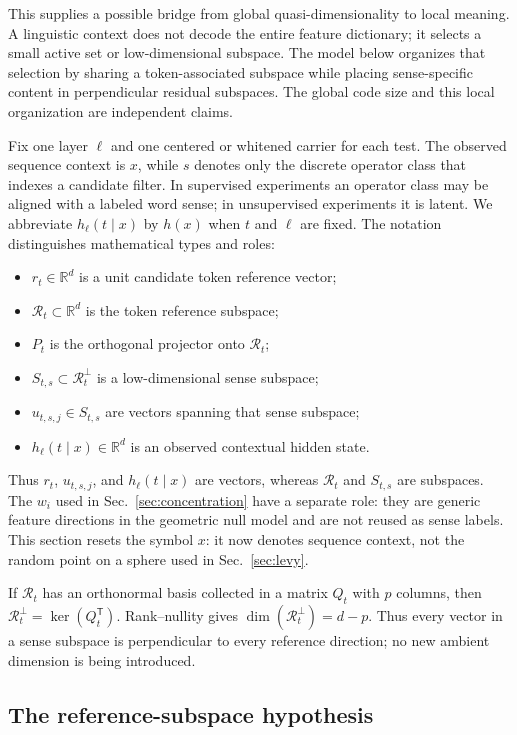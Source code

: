 \documentclass[
  aps,
  reprint,
  superscriptaddress,
  floatfix,
  nofootinbib,
  longbibliography
]{revtex4-2}
\newcommand{\R}{\mathbb{R}}
\newcommand{\T}{^{\mathsf{T}}}
\begin{document}
This supplies a possible bridge from global quasi-dimensionality to local
meaning.  A linguistic context does not decode the entire feature dictionary;
it selects a small active set or low-dimensional subspace.  The model below
organizes that selection by sharing a token-associated subspace while placing
sense-specific content in perpendicular residual subspaces.  The global code
size and this local organization are independent claims.

Fix one layer $\ell$ and one centered or whitened carrier for each test.  The
observed sequence context is $x$, while $s$ denotes only the discrete operator
class that indexes a candidate filter.  In supervised experiments an operator
class may be aligned with a labeled word sense; in unsupervised experiments it
is latent.  We abbreviate $h_\ell(t\mid x)$ by $h(x)$ when $t$ and $\ell$ are
fixed.  The notation distinguishes mathematical types and roles:
%
\begin{itemize}
\item $r_t\in\R^d$ is a unit candidate token reference vector;
\item $\mathcal R_t\subset\R^d$ is the token reference subspace;
\item $P_t$ is the orthogonal projector onto $\mathcal R_t$;
\item $S_{t,s}\subset\mathcal R_t^\perp$ is a low-dimensional sense
subspace;
\item $u_{t,s,j}\in S_{t,s}$ are vectors spanning that sense subspace;
\item $h_\ell(t\mid x)\in\R^d$ is an observed contextual hidden state.
\end{itemize}
%
Thus $r_t$, $u_{t,s,j}$, and $h_\ell(t\mid x)$ are vectors, whereas
$\mathcal R_t$ and $S_{t,s}$ are subspaces. The $w_i$ used in
Sec.~\ref{sec:concentration} have a separate role: they are generic feature
directions in the geometric null model and are not reused as sense labels.
This section resets the symbol $x$: it now denotes sequence context, not the
random point on a sphere used in Sec.~\ref{sec:levy}.

If $\mathcal R_t$ has an orthonormal basis collected in a matrix $Q_t$ with
$p$ columns, then $\mathcal R_t^\perp=\ker(Q_t\T)$.  Rank--nullity gives
$\dim(\mathcal R_t^\perp)=d-p$.  Thus every vector in a sense subspace is
perpendicular to every reference direction; no new ambient dimension is being
introduced.

\subsection{The reference-subspace hypothesis}
\label{sec:reference-hypothesis}
\end{document}

